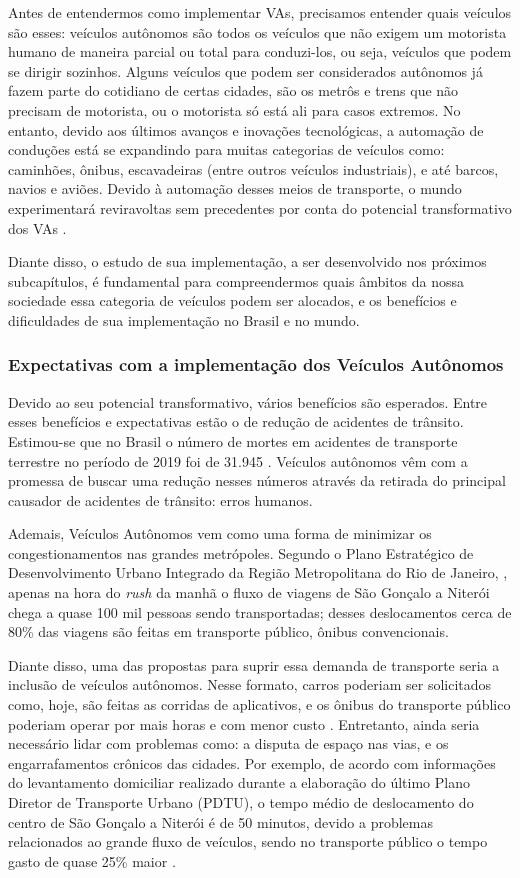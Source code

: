 Antes de entendermos como implementar VAs, precisamos entender quais veículos são esses: veículos autônomos são todos os veículos que não exigem um motorista humano de maneira parcial ou total para conduzi-los, ou seja, veículos que podem se dirigir sozinhos. Alguns veículos que podem ser considerados autônomos já fazem parte do cotidiano de certas cidades, são os metrôs e trens que não precisam de motorista, ou o motorista só está ali para casos extremos. No entanto, devido aos últimos avanços e inovações tecnológicas, a automação de conduções está se expandindo para muitas categorias de veículos como: caminhões, ônibus, escavadeiras (entre outros veículos industriais), e até barcos, navios e aviões. Devido à automação desses meios de transporte, o mundo experimentará reviravoltas sem precedentes por conta do potencial transformativo dos VAs \cite{4cenarios_ocidental}.

Diante disso, o estudo de sua implementação, a ser desenvolvido nos próximos subcapítulos, é fundamental para compreendermos quais âmbitos da nossa sociedade essa categoria de veículos podem ser alocados, e os benefícios e dificuldades de sua implementação no Brasil e no mundo.

 \subsubsection{Expectativas com a implementação dos Veículos Autônomos}
Devido ao seu potencial transformativo, vários benefícios são esperados. Entre esses benefícios e expectativas estão o de redução de acidentes de trânsito. Estimou-se que no Brasil o número de mortes em acidentes de transporte terrestre no período de 2019 foi de 31.945 \cite{Anexo_I_pnatrans}. Veículos autônomos vêm com a promessa de buscar uma redução nesses números através da retirada do principal causador de acidentes de trânsito: erros humanos. 

Ademais, Veículos Autônomos vem como uma forma de minimizar os congestionamentos nas grandes metrópoles. Segundo o Plano Estratégico de Desenvolvimento Urbano Integrado da Região Metropolitana do Rio de Janeiro, \cite{rj_transito}, apenas na hora do \textit{rush} da manhã o fluxo de viagens de São Gonçalo a Niterói chega a quase 100 mil pessoas sendo transportadas; desses deslocamentos cerca de 80\% das viagens são feitas em transporte público, ônibus convencionais. 

Diante disso, uma das propostas para suprir essa demanda de transporte seria a inclusão de veículos autônomos. Nesse formato, carros poderiam ser solicitados como, hoje, são feitas as corridas de aplicativos, e os ônibus do transporte público poderiam operar por mais horas e com menor custo \cite{4cenarios_ocidental}. 
Entretanto, ainda seria necessário lidar com problemas como: a disputa de espaço nas vias, e os engarrafamentos crônicos das cidades. Por exemplo, de acordo com informações do levantamento domiciliar realizado durante a elaboração do último Plano Diretor de Transporte Urbano (PDTU), o tempo médio de deslocamento do centro de São Gonçalo a Niterói é de 50 minutos, devido a problemas relacionados ao grande fluxo de veículos, sendo no transporte público o tempo gasto de quase 25\% maior \cite{rj_transito}.


